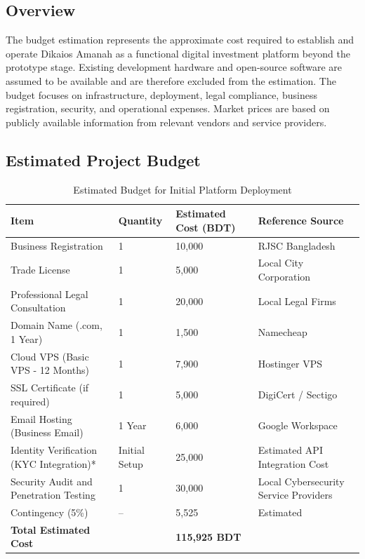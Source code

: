 \subsection{Overview}

The budget estimation represents the approximate cost required to establish and operate Dikaios Amanah as a functional digital investment platform beyond the prototype stage. Existing development hardware and open-source software are assumed to be available and are therefore excluded from the estimation. The budget focuses on infrastructure, deployment, legal compliance, business registration, security, and operational expenses. Market prices are based on publicly available information from relevant vendors and service providers.


\subsection{Estimated Project Budget}

\begin{table}[H]
\centering
\begin{tabular}{|p{5.5cm}|p{2cm}|p{2.5cm}|p{4cm}|}
\hline
\textbf{Item} & \textbf{Quantity} & \textbf{Estimated Cost (BDT)} & \textbf{Reference Source} \\
\hline
Business Registration & 1 & 10,000 & RJSC Bangladesh \\
\hline
Trade License & 1 & 5,000 & Local City Corporation \\
\hline
Professional Legal Consultation & 1 & 20,000 & Local Legal Firms \\
\hline
Domain Name (.com, 1 Year) & 1 & 1,500 & Namecheap \\
\hline
Cloud VPS (Basic VPS - 12 Months) & 1 & 7,900 & Hostinger VPS \\
\hline
SSL Certificate (if required) & 1 & 5,000 & DigiCert / Sectigo \\
\hline
Email Hosting (Business Email) & 1 Year & 6,000 & Google Workspace \\
\hline
Identity Verification (KYC Integration)* & Initial Setup & 25,000 & Estimated API Integration Cost \\
\hline
Security Audit and Penetration Testing & 1 & 30,000 & Local Cybersecurity Service Providers \\
\hline
Contingency (5\%) & -- & 5,525 & Estimated \\
\hline
\textbf{Total Estimated Cost} & & \textbf{115,925 BDT} & \\
\hline
\end{tabular}
\caption{Estimated Budget for Initial Platform Deployment}
\end{table}

